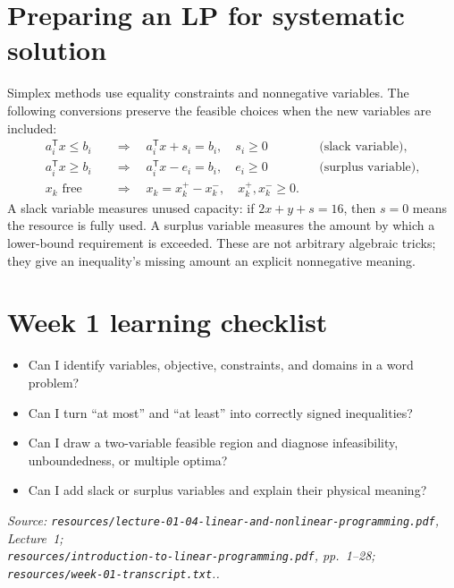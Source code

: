 \documentclass[11pt,a4paper]{article}
\renewcommand{\texttt}[1]{\nolinkurl{#1}}
\newcommand{\T}{\mathsf{T}}
\newcommand{\source}[1]{\par\smallskip\noindent\textit{Source: #1.}\par\smallskip}
\begin{document}
\section{Preparing an LP for systematic solution}
Simplex methods use equality constraints and nonnegative variables. The following conversions preserve the feasible choices when the new variables are included:
\begin{align*}
 a_i^\T x\leq b_i&\quad\Longrightarrow\quad a_i^\T x+s_i=b_i,\quad s_i\geq0 &&\text{(slack variable)},\\
 a_i^\T x\geq b_i&\quad\Longrightarrow\quad a_i^\T x-e_i=b_i,\quad e_i\geq0 &&\text{(surplus variable)},\\
 x_k\text{ free}&\quad\Longrightarrow\quad x_k=x_k^+-x_k^-,\quad x_k^+,x_k^-\geq0.
\end{align*}
A slack variable measures unused capacity: if $2x+y+s=16$, then $s=0$ means the resource is fully used. A surplus variable measures the amount by which a lower-bound requirement is exceeded. These are not arbitrary algebraic tricks; they give an inequality's missing amount an explicit nonnegative meaning.

\section{Week 1 learning checklist}
\begin{itemize}
\item Can I identify variables, objective, constraints, and domains in a word problem?
\item Can I turn ``at most'' and ``at least'' into correctly signed inequalities?
\item Can I draw a two-variable feasible region and diagnose infeasibility, unboundedness, or multiple optima?
\item Can I add slack or surplus variables and explain their physical meaning?
\end{itemize}
\source{\texttt{resources/lecture-01-04-linear-and-nonlinear-programming.pdf}, Lecture~1;\\
\texttt{resources/introduction-to-linear-programming.pdf}, pp.~1--28;\\
\texttt{resources/week-01-transcript.txt}.}
\end{document}
